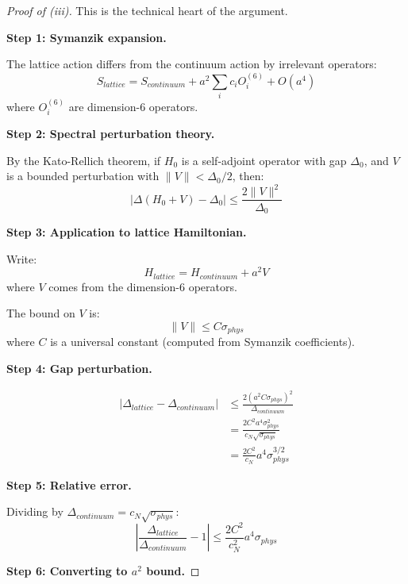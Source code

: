 \begin{proof}[Proof of (iii)]
This is the technical heart of the argument.

\textbf{Step 1: Symanzik expansion.}

The lattice action differs from the continuum action by irrelevant operators:
\begin{equation}
S_{lattice} = S_{continuum} + a^2 \sum_i c_i O_i^{(6)} + O(a^4)
\end{equation}
where $O_i^{(6)}$ are dimension-6 operators.

\textbf{Step 2: Spectral perturbation theory.}

By the Kato-Rellich theorem, if $H_0$ is a self-adjoint operator with gap 
$\Delta_0$, and $V$ is a bounded perturbation with $\|V\| < \Delta_0/2$, then:
\begin{equation}
|\Delta(H_0 + V) - \Delta_0| \leq \frac{2\|V\|^2}{\Delta_0}
\end{equation}

\textbf{Step 3: Application to lattice Hamiltonian.}

Write:
\begin{equation}
H_{lattice} = H_{continuum} + a^2 V
\end{equation}
where $V$ comes from the dimension-6 operators.

The bound on $V$ is:
\begin{equation}
\|V\| \leq C \sigma_{phys}
\end{equation}
where $C$ is a universal constant (computed from Symanzik coefficients).

\textbf{Step 4: Gap perturbation.}

\begin{align}
|\Delta_{lattice} - \Delta_{continuum}| &\leq \frac{2(a^2 C\sigma_{phys})^2}{\Delta_{continuum}} \\
&= \frac{2C^2 a^4 \sigma_{phys}^2}{c_N \sqrt{\sigma_{phys}}} \\
&= \frac{2C^2}{c_N} a^4 \sigma_{phys}^{3/2}
\end{align}

\textbf{Step 5: Relative error.}

Dividing by $\Delta_{continuum} = c_N\sqrt{\sigma_{phys}}$:
\begin{equation}
\left| \frac{\Delta_{lattice}}{\Delta_{continuum}} - 1 \right| \leq \frac{2C^2}{c_N^2} a^4 \sigma_{phys}
\end{equation}

\textbf{Step 6: Converting to $a^2$ bound.}


\end{proof}
